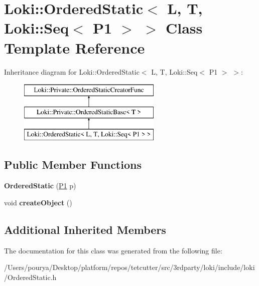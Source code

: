\hypertarget{classLoki_1_1OrderedStatic_3_01L_00_01T_00_01Loki_1_1Seq_3_01P1_01_4_01_4}{}\section{Loki\+:\+:Ordered\+Static$<$ L, T, Loki\+:\+:Seq$<$ P1 $>$ $>$ Class Template Reference}
\label{classLoki_1_1OrderedStatic_3_01L_00_01T_00_01Loki_1_1Seq_3_01P1_01_4_01_4}
Inheritance diagram for Loki\+:\+:Ordered\+Static$<$ L, T, Loki\+:\+:Seq$<$ P1 $>$ $>$\+:\begin{figure}[H]
\begin{center}
\leavevmode
\includegraphics[height=3.000000cm]{classLoki_1_1OrderedStatic_3_01L_00_01T_00_01Loki_1_1Seq_3_01P1_01_4_01_4}
\end{center}
\end{figure}
\subsection*{Public Member Functions}
\begin{DoxyCompactItemize}
\item 
\hypertarget{classLoki_1_1OrderedStatic_3_01L_00_01T_00_01Loki_1_1Seq_3_01P1_01_4_01_4_a46ee9316cf9b062498e1113517d46508}{}{\bfseries Ordered\+Static} (\hyperlink{structP1}{P1} p)\label{classLoki_1_1OrderedStatic_3_01L_00_01T_00_01Loki_1_1Seq_3_01P1_01_4_01_4_a46ee9316cf9b062498e1113517d46508}

\item 
\hypertarget{classLoki_1_1OrderedStatic_3_01L_00_01T_00_01Loki_1_1Seq_3_01P1_01_4_01_4_a7b7789e3ff2858aeb585882e6b9e352e}{}void {\bfseries create\+Object} ()\label{classLoki_1_1OrderedStatic_3_01L_00_01T_00_01Loki_1_1Seq_3_01P1_01_4_01_4_a7b7789e3ff2858aeb585882e6b9e352e}

\end{DoxyCompactItemize}
\subsection*{Additional Inherited Members}


The documentation for this class was generated from the following file\+:\begin{DoxyCompactItemize}
\item 
/\+Users/pourya/\+Desktop/platform/repos/tetcutter/src/3rdparty/loki/include/loki/Ordered\+Static.\+h\end{DoxyCompactItemize}
